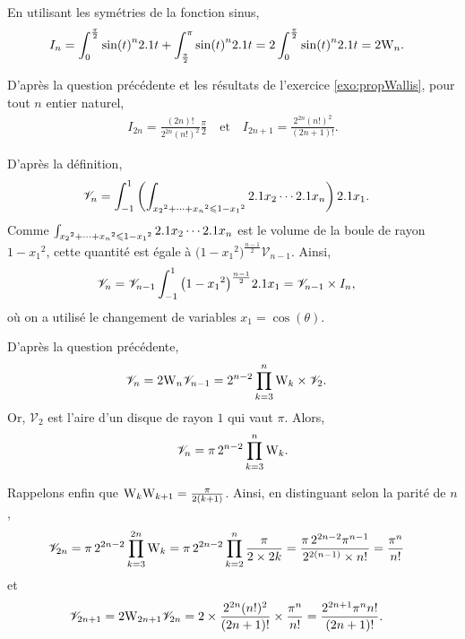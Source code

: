 \begin{solution}
\begin{reponses}
\item En utilisant les symétries de la fonction sinus,
\begin{align*}
I_n
&= \int_0^{\frac{\pi}{2}} \sin(t)^n 2.1 t + \int_{\frac{\pi}{2}}^\pi \sin(t)^n 2.1 t
= 2 \int_0^{\frac{\pi}{2}} \sin(t)^n 2.1 t
= 2 \mathrm{W}_n.
\end{align*}

\item D'après la question précédente et les résultats de l'exercice \ref{exo:propWallis}, pour tout $n$ entier naturel,
\begin{align*}
I_{2n} = \frac{(2n)!}{2^{2n} (n!)^2} \frac{\pi}{2}
\quad \text{et} \quad
I_{2n+1} = \frac{2^{2n} (n!)^2}{(2n+1)!}.
\end{align*}

\item D'après la définition,
\begin{align*}
\mathscr{V}_n
&= \int_{-1}^1 \left(\int_{x_2{}^2 + \cdots + x_n{}^2 \leqslant 1 - x_1{}^2} 2.1 x_2 \cdots 2.1 x_n\right) 2.1 x_1.
\end{align*}
Comme $\int_{x_2{}^2 + \cdots + x_n{}^2 \leqslant 1 - x_1{}^2} 2.1 x_2 \cdots 2.1 x_n$ est le volume de la boule de rayon $1 - x_1{}^2$, cette quantité est égale à $\big(1 - x_1{}^2\big)^{\frac{n-1}{2}} \mathscr{V}_{n-1}$. Ainsi,
\begin{align*}
\mathscr{V}_n
&= \mathscr{V}_{n-1} \int_{-1}^1 \big(1 - x_1{}^2\big)^{\frac{n-1}{2}} 2.1 x_1
= \mathscr{V}_{n-1} \times I_n,
\end{align*}
où on a utilisé le changement de variables $x_1 = \cos(\theta)$.

\item D'après la question précédente,
\begin{align*}
\mathscr{V}_n
&= 2 \mathrm{W}_n \mathscr{V}_{n-1}
= 2^{n-2} \prod_{k=3}^n \mathrm{W}_k \times \mathscr{V}_2.
\end{align*}
Or, $\mathscr{V}_2$ est l'aire d'un disque de rayon $1$ qui vaut $\pi$. Alors,
\[
\mathscr{V}_n = \pi\, 2^{n-2} \prod_{k=3}^n \mathrm{W}_k.
\]

Rappelons enfin que $\mathrm{W}_k \mathrm{W}_{k+1} = \frac{\pi}{2(k+1)}$. Ainsi, en distinguant selon la parité de $n$,
\begin{align*}
\mathscr{V}_{2n}
&= \pi\, 2^{2n-2} \prod_{k=3}^{2n} \mathrm{W}_k
= \pi\, 2^{2n-2} \prod_{k=2}^{n} \frac{\pi}{2 \times 2 k}
= \frac{\pi\, 2^{2n-2} \pi^{n-1}}{2^{2(n-1)} \times n!}
= \frac{\pi^n}{n!}
\end{align*}
et
\begin{align*}
\mathscr{V}_{2n+1}
&= 2 \mathrm{W}_{2n+1} \mathscr{V}_{2n}
= 2 \times \frac{2^{2n} (n!)^2}{(2n+1)!} \times \frac{\pi^n}{n!}
= \frac{2^{2n+1} \pi^n n!}{(2n+1)!}.
\end{align*}
\end{reponses}
\end{solution}

